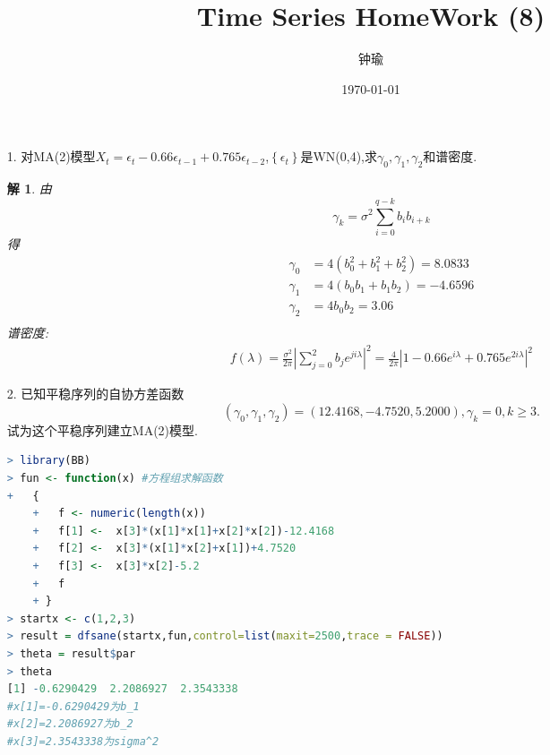 \documentclass[11pt,a4paper]{ctexart}
\title{Time Series HomeWork (8)}
\author{钟瑜 \quad 222018314210044}
\date{\today}
\newtheorem*{solution}{解}
\begin{document}
\maketitle
\pagestyle{plain}%
\begin{enumerate}
	
\item[1.] 对MA(2)模型$ X_t=\epsilon_t-0.66\epsilon_{t-1}+0.765\epsilon_{t-2} $,$ \left\lbrace \epsilon_t \right\rbrace  $是WN(0,4),求$ \gamma_0,\gamma_1,\gamma_2 $和谱密度.
\begin{solution}
由
\begin{equation}
\gamma_k=\sigma^2\sum_{i=0}^{q-k}b_ib_{i+k}
\end{equation}
得
\begin{equation}
\begin{aligned}
\gamma_0 &=4(b_0^2+b_1^2+b_2^2)=8.0833\\
\gamma_1 &=4(b_0b_1+b_1b_2)=-4.6596\\
\gamma_2 &=4b_0b_2=3.06\\
\end{aligned}
\end{equation}
谱密度:
\begin{equation}
	\begin{aligned}
		f(\lambda) =\frac{\sigma^2}{2\pi}|\sum_{j=0}^{2}b_je^{ji\lambda}|^2
		=\frac{4}{2\pi}|1-0.66e^{i\lambda}+0.765e^{2i\lambda}|^2
	\end{aligned}
\end{equation}

\end{solution}


\item[2.]已知平稳序列的自协方差函数
\begin{equation}
	(\gamma_0,\gamma_1,\gamma_2)=(12.4168,-4.7520,5.2000),\gamma_k=0,k\geq 3.
\end{equation}
试为这个平稳序列建立MA(2)模型.
\begin{lstlisting}[language=R]
> library(BB)
> fun <- function(x) #方程组求解函数
+   { 
	+   f <- numeric(length(x)) 
	+   f[1] <-  x[3]*(x[1]*x[1]+x[2]*x[2])-12.4168
	+   f[2] <-  x[3]*(x[1]*x[2]+x[1])+4.7520
	+   f[3] <-  x[3]*x[2]-5.2
	+   f 
	+ } 
> startx <- c(1,2,3)
> result = dfsane(startx,fun,control=list(maxit=2500,trace = FALSE))
> theta = result$par
> theta
[1] -0.6290429  2.2086927  2.3543338
#x[1]=-0.6290429为b_1
#x[2]=2.2086927为b_2
#x[3]=2.3543338为sigma^2
\end{lstlisting}



\end{enumerate}
\end{document}
